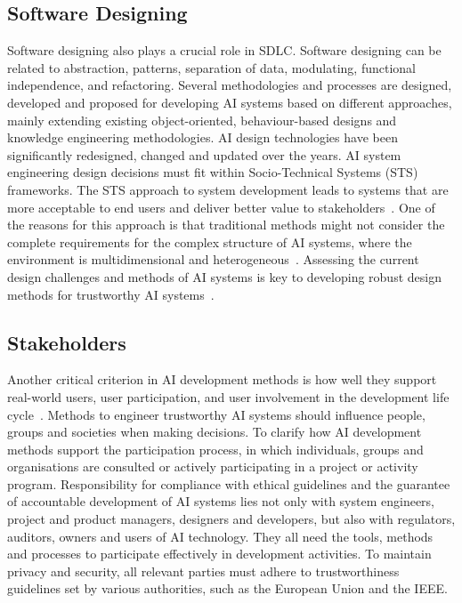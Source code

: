 \documentclass[a4paper,11pt]{article}
\begin{document}
\subsection{Software Designing}
Software designing also plays a crucial role in SDLC. Software designing can be related to abstraction, patterns, separation of data, modulating, functional independence, and refactoring. Several methodologies and processes are designed, developed and proposed for developing AI systems based on different approaches, mainly extending existing object-oriented, behaviour-based designs and knowledge engineering methodologies. AI design technologies have been significantly redesigned, changed and updated over the years.  AI system engineering design decisions must fit within Socio-Technical Systems (STS) frameworks. The STS approach to system development leads to systems that are more acceptable to end users and deliver better value to stakeholders~\cite{baxter2011socio}. One of the reasons for this approach is that traditional methods might not consider the complete requirements for the complex structure of AI systems, where the environment is multidimensional and heterogeneous~\cite{aldewereld2015design}. Assessing the current design challenges and methods of AI systems is key to developing robust design methods for trustworthy AI systems~\cite{umbrello2021mapping}. 

\subsection{Stakeholders}

Another critical criterion in AI development methods is how well they support real-world users, user participation, and user involvement in the development life cycle~\cite{li2023trustworthy, gonzalez2022trustworthy}. Methods to engineer trustworthy AI systems should influence people, groups and societies when making decisions. To clarify how AI development methods support the participation process, in which individuals, groups and organisations are consulted or actively participating in a project or activity program.  Responsibility for compliance with ethical guidelines and the guarantee of accountable development of AI systems lies not only with system engineers, project and product managers, designers and developers, but also with regulators, auditors, owners and users of AI technology. They all need the tools, methods and processes to participate effectively in development activities. To maintain privacy and security, all relevant parties must adhere to trustworthiness guidelines set by various authorities, such as the European Union and the IEEE. 
\end{document}
